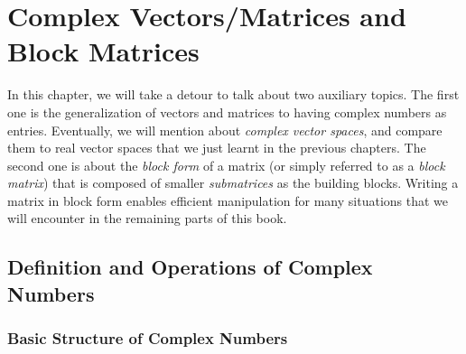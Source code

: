\chapter{Complex Vectors/Matrices and Block Matrices}
\label{chap:complex}

In this chapter, we will take a detour to talk about two auxiliary topics. The first one is the generalization of vectors and matrices to having complex numbers as entries. Eventually, we will mention about \textit{complex vector spaces}, and compare them to real vector spaces that we just learnt in the previous chapters. The second one is about the \textit{block form} of a matrix (or simply referred to as a \textit{block matrix}) that is composed of smaller \textit{submatrices} as the building blocks. Writing a matrix in block form enables efficient manipulation for many situations that we will encounter in the remaining parts of this book.

\section{Definition and Operations of Complex Numbers}
\label{section:complexno}

\subsection{Basic Structure of Complex Numbers} 

